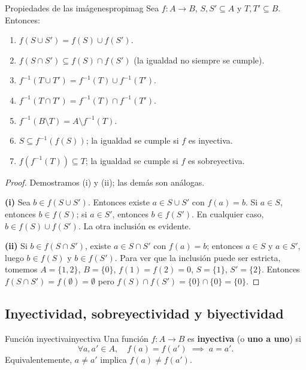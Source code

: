 \begin{proposicion}{Propiedades de las imágenes}{propimag}
Sea $f: A \to B$, $S, S' \subseteq A$ y $T, T' \subseteq B$. Entonces:
\begin{enumerate}[leftmargin=2em, label=(\roman*)]
  \item $f(S \cup S') = f(S) \cup f(S')$.
  \item $f(S \cap S') \subseteq f(S) \cap f(S')$ \quad (la igualdad no siempre se cumple).
  \item $f^{-1}(T \cup T') = f^{-1}(T) \cup f^{-1}(T')$.
  \item $f^{-1}(T \cap T') = f^{-1}(T) \cap f^{-1}(T')$.
  \item $f^{-1}(B \setminus T) = A \setminus f^{-1}(T)$.
  \item $S \subseteq f^{-1}(f(S))$; la igualdad se cumple si $f$ es inyectiva.
  \item $f(f^{-1}(T)) \subseteq T$; la igualdad se cumple si $f$ es sobreyectiva.
\end{enumerate}
\end{proposicion}

\begin{proof}
Demostramos (i) y (ii); las demás son análogas.

\textbf{(i)} Sea $b \in f(S \cup S')$. Entonces existe $a \in S \cup S'$ con $f(a) = b$. Si $a \in S$, entonces $b \in f(S)$; si $a \in S'$, entonces $b \in f(S')$. En cualquier caso, $b \in f(S) \cup f(S')$. La otra inclusión es evidente.

\textbf{(ii)} Si $b \in f(S \cap S')$, existe $a \in S \cap S'$ con $f(a) = b$; entonces $a \in S$ y $a \in S'$, luego $b \in f(S)$ y $b \in f(S')$. Para ver que la inclusión puede ser estricta, tomemos $A = \{1, 2\}$, $B = \{0\}$, $f(1) = f(2) = 0$, $S = \{1\}$, $S' = \{2\}$. Entonces $f(S \cap S') = f(\emptyset) = \emptyset$ pero $f(S) \cap f(S') = \{0\} \cap \{0\} = \{0\}$.
\end{proof}

\subsection{Inyectividad, sobreyectividad y biyectividad}

\begin{definicion}{Función inyectiva}{inyectiva}
Una función $f: A \to B$ es \textbf{inyectiva} (o \textbf{uno a uno}) si
\[
  \forall a, a' \in A,\quad f(a) = f(a') \;\implies\; a = a'.
\]
Equivalentemente, $a \neq a'$ implica $f(a) \neq f(a')$.
\end{definicion}

